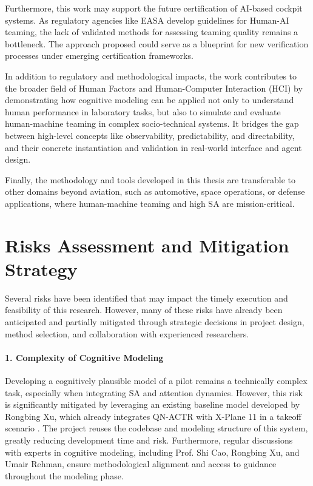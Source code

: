 \documentclass[12pt,a4paper]{article} %
\begin{document}
	Furthermore, this work may support the future certification of AI-based cockpit systems. As regulatory agencies like EASA develop guidelines for Human-AI teaming, the lack of validated methods for assessing teaming quality remains a bottleneck. The approach proposed could serve as a blueprint for new verification processes under emerging certification frameworks.
	
	In addition to regulatory and methodological impacts, the work contributes to the broader field of Human Factors and Human-Computer Interaction (HCI) by demonstrating how cognitive modeling can be applied not only to understand human performance in laboratory tasks, but also to simulate and evaluate human-machine teaming in complex socio-technical systems. It bridges the gap between high-level concepts like observability, predictability, and directability, and their concrete instantiation and validation in real-world interface and agent design.
	
	Finally, the methodology and tools developed in this thesis are transferable to other domains beyond aviation, such as automotive, space operations, or defense applications, where human-machine teaming and high SA are mission-critical.	
	
	\section{Risks Assessment and Mitigation Strategy}

	Several risks have been identified that may impact the timely execution and feasibility of this research. However, many of these risks have already been anticipated and partially mitigated through strategic decisions in project design, method selection, and collaboration with experienced researchers.

	\paragraph{1. Complexity of Cognitive Modeling}
	Developing a cognitively plausible model of a pilot remains a technically complex task, especially when integrating SA and attention dynamics. However, this risk is significantly mitigated by leveraging an existing baseline model developed by Rongbing Xu, which already integrates QN-ACTR with X-Plane 11 in a takeoff scenario \parencite{xu_modeling_2021}. The project reuses the codebase and modeling structure of this system, greatly reducing development time and risk. Furthermore, regular discussions with experts in cognitive modeling, including Prof. Shi Cao, Rongbing Xu, and Umair Rehman, ensure methodological alignment and access to guidance throughout the modeling phase.
\end{document}

